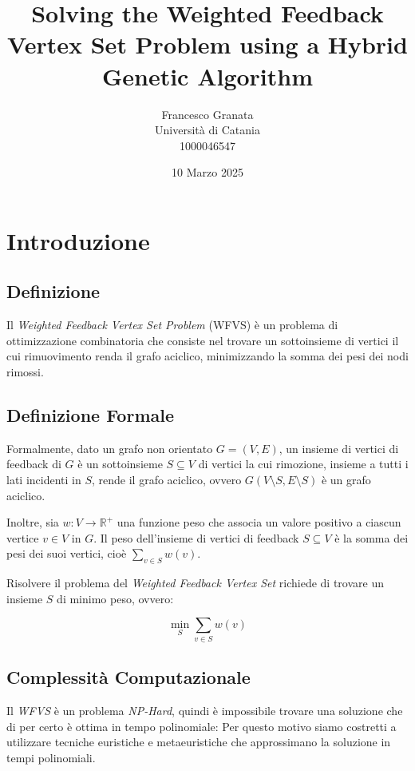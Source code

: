 \documentclass[a4paper,12pt]{article}
\title{Solving the Weighted Feedback Vertex Set Problem using a Hybrid Genetic Algorithm}
\author{Francesco Granata \\ Università di Catania \\ 1000046547}
\date{10 Marzo 2025}
\begin{document}
\maketitle
\newpage
\tableofcontents 
\newpage

\section{Introduzione}
\subsection{Definizione}
Il \textit{Weighted Feedback Vertex Set Problem} (WFVS) è un problema di ottimizzazione combinatoria che consiste nel trovare un sottoinsieme di vertici il cui rimuovimento renda il grafo aciclico, minimizzando la somma dei pesi dei nodi rimossi. 

\subsection{Definizione Formale}
Formalmente, dato un grafo non orientato \( G = (V, E) \), un insieme di vertici di feedback di \( G \) è un sottoinsieme \( S \subseteq V \) di vertici la cui rimozione, insieme a tutti i lati incidenti in \( S \), rende il grafo aciclico, ovvero \( G(V \setminus S, E \setminus S) \) è un grafo aciclico.

Inoltre, sia \( w: V \to \mathbb{R}^{+} \) una funzione peso che associa un valore positivo a ciascun vertice \( v \in V \) in \( G \). Il peso dell'insieme di vertici di feedback \( S \subseteq V \) è la somma dei pesi dei suoi vertici, cioè \( \sum_{v \in S} w(v) \).

Risolvere il problema del \textit{Weighted Feedback Vertex Set} richiede di trovare un insieme \( S \) di minimo peso, ovvero:

\begin{equation}
\min_{S} \sum_{v \in S} w(v)
\end{equation}

\subsection{Complessità Computazionale}
Il \textit{WFVS} è un problema \textit{NP-Hard}, quindi è impossibile trovare una soluzione che di per certo è ottima in tempo polinomiale:
Per questo motivo siamo costretti a utilizzare tecniche euristiche e metaeuristiche che approssimano la soluzione in tempi polinomiali.
\end{document}
